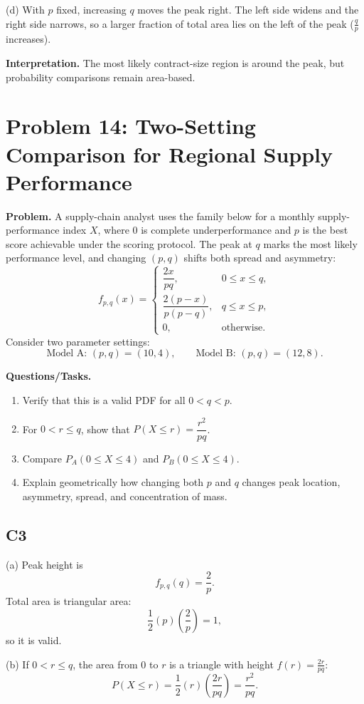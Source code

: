 (d) With $p$ fixed, increasing $q$ moves the peak right. The left side widens and the right side narrows, so a larger fraction of total area lies on the left of the peak ($\frac{q}{p}$ increases).

\textbf{Interpretation.}
The most likely contract-size region is around the peak, but probability comparisons remain area-based.

\section{Problem 14: Two-Setting Comparison for Regional Supply Performance}

\textbf{Problem.}
A supply-chain analyst uses the family below for a monthly supply-performance index $X$, where $0$ is complete underperformance and $p$ is the best score achievable under the scoring protocol. The peak at $q$ marks the most likely performance level, and changing $(p,q)$ shifts both spread and asymmetry:
\[
f_{p,q}(x)=\begin{cases}
\dfrac{2x}{pq}, & 0\le x\le q,\\
\dfrac{2(p-x)}{p(p-q)}, & q\le x\le p,\\
0, & \text{otherwise.}
\end{cases}
\]
Consider two parameter settings:
\[
\text{Model A: }(p,q)=(10,4),\qquad \text{Model B: }(p,q)=(12,8).
\]

\textbf{Questions/Tasks.}
\begin{enumerate}[label=(\alph*)]
\item Verify that this is a valid PDF for all $0<q<p$.
\item For $0<r\le q$, show that $P(X\le r)=\dfrac{r^2}{pq}$.
\item Compare $P_A(0\le X\le 4)$ and $P_B(0\le X\le 4)$.
\item Explain geometrically how changing both $p$ and $q$ changes peak location, asymmetry, spread, and concentration of mass.
\end{enumerate}

\subsection*{C3}
(a) Peak height is
\[
f_{p,q}(q)=\frac{2}{p}.
\]
Total area is triangular area:
\[
\frac12(p)\left(\frac{2}{p}\right)=1,
\]
so it is valid.

(b) If $0<r\le q$, the area from $0$ to $r$ is a triangle with height $f(r)=\frac{2r}{pq}$:
\[
P(X\le r)=\frac12(r)\left(\frac{2r}{pq}\right)=\frac{r^2}{pq}.
\]

